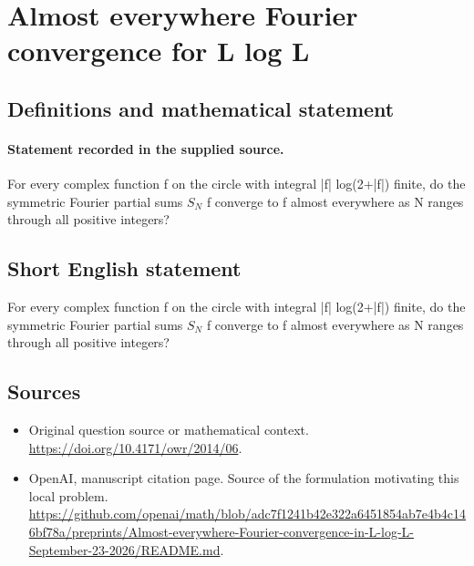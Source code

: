 \documentclass[11pt]{article}
\begin{document}
\section*{Almost everywhere Fourier convergence for L log L}\label{30007427}
\subsection{Definitions and mathematical statement}
\paragraph{Statement recorded in the supplied source.}
For every complex function f on the circle with integral |f| log(2+|f|) finite, do the symmetric Fourier partial sums $S_N$ f converge to f almost everywhere as N ranges through all positive integers?
\subsection{Short English statement}
For every complex function f on the circle with integral |f| log(2+|f|) finite, do the symmetric Fourier partial sums $S_N$ f converge to f almost everywhere as N ranges through all positive integers?
\subsection{Sources}
\begin{itemize}
\item[S1] Original question source or mathematical context.
\url{https://doi.org/10.4171/owr/2014/06}.
\item[S2] OpenAI, manuscript citation page. Source of the formulation motivating this local problem.
\url{https://github.com/openai/math/blob/adc7f1241b42e322a6451854ab7e4b4c146bf78a/preprints/Almost-everywhere-Fourier-convergence-in-L-log-L-September-23-2026/README.md}.
\end{itemize}
\end{document}
